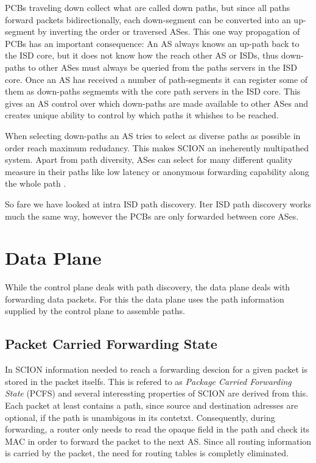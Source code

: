 \documentclass[../eva1_scion.tex]{subfiles}
\begin{document}
    PCBs traveling down collect what are called down paths, but since all paths forward packets bidirectionally, each down-segment can be converted into an up-segment by inverting the order or traversed ASes. This one way propagation of PCBs has an important consequence: An AS always knows an up-path back to the ISD core, but it does not know how the reach other AS or ISDs, thus down-paths to other ASes must always be queried from the paths servers in the ISD core. Once an AS has received a number of path-segments it can register some of them as down-paths segmemts with the core path servers in the ISD core. This gives an AS control over which down-paths are made available to other ASes and creates unique ability to control by which paths it whishes to be reached.

    When selecting down-paths an AS tries to select as diverse paths as possible in order reach maximum redudancy. This makes SCION an ineherently multipathed system. Apart from path diversity, ASes can select for many different quality measure in their paths like low latency or anonymous forwarding capability along the whole path \cite{scion_2011}.

    So fare we have looked at intra ISD path discovery. Iter ISD path discovery works much the same way, however the PCBs are only forwarded between core ASes.

    \section{Data Plane}
    While the control plane deals with path discovery, the data plane deals with forwarding data packets. For this the data plane uses the path information supplied by the control plane to assemble paths.

    \subsection{Packet Carried Forwarding State}\label{ssec:pcfs}
    In SCION information needed to reach a forwarding descion for a given packet is stored in the packet itselfs. This is refered to as \textit{Package Carried Forwarding State} (PCFS) and several interessting properties of SCION are derived from this. Each packet at least contains a path, since source and destination adresses are optional, if the path is unambigous in its contetxt. Consequently, during forwarding, a router only needs to read the opaque field in the path and check its MAC in order to forward the packet to the next AS. Since all routing information is carried by the packet, the need for routing tables is completly eliminated.
\end{document}
